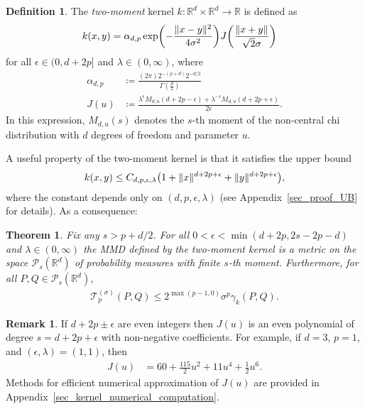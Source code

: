 \documentclass{article}
\newtheorem{theorem}{Theorem}
\theoremstyle{definition}
\newtheorem{definition}{Definition}
\newtheorem{remark}{Remark}
\newcommand{\reals}{\mathbb{R}}
\newcommand{\cP}{\mathcal{P}}
\newcommand{\cT}{\mathcal{T}}
\newcommand{\eps}{\epsilon}
\newcommand{\appname}{Appendix}
\newcommand{\appname}{Supplement}
\let\originalleft\left
\let\originalright\right
\renewcommand{\left}{\mathopen{}\mathclose\bgroup\originalleft}
\renewcommand{\right}{\aftergroup\egroup\originalright}
\begin{document}
\begin{definition}\label{def:two_moment} The \emph{two-moment} kernel $k \colon \reals^d \times \reals^d \to \reals$ is defined as
 \begin{align}
    k(x,y)  &= \alpha_{d,p} \exp\left( -\frac{ \|x-y\|^2}{ 4 \sigma^2}\right) J\left( \frac{ \|x+y\|}{\sqrt{2} \sigma} \right) \label{eq:kernel_two_moment}
\end{align}
for all $\eps \in (0,d+2p]$ and $\lambda \in (0,\infty)$, where 
\begin{align*}
\alpha_{d,p} &\coloneqq  \frac{(2 \pi) 2^{-(p+d)} 2^{-d/2} }{\Gamma(\frac{d}{2})}\\
    J(u)& \coloneqq  \frac{  \lambda^\eps M_{d,u}(d \!+\! 2p \!-\! \eps) +  \lambda^{-\eps} M_{d,u}(d\!+\!2p \!+\! \eps) }{ 2 \eps}.
\end{align*}
In this expression,  $M_{d,u}(s)$ denotes the $s$-th moment of the non-central chi distribution with  $d$ degrees of freedom and parameter $u$.
\end{definition}

A useful property of the two-moment kernel is that it satisfies the upper bound
\begin{align*}
k(x,y) \le C_{d,p,\eps,\lambda} \left(  1 + \|x\|^{d + 2p + \eps} + \|y\|^{d + 2p + \eps}\right),
\end{align*}
where the constant depends only on $(d,p,\eps, \lambda)$ (see \appname~\ref{sec_proof_UB} for details). As a consequence:

\begin{theorem}\label{thm_two_moment}
Fix any $s > p + d/2$. For all $0 < \eps < \min(d + 2p, 2s  - 2p - d) $ and $\lambda \in (0, \infty)$ the  MMD defined by the two-moment kernel is a metric on the space $\cP_s(\reals^d)$ of probability measures with finite $s$-th moment. Furthermore, for all $P, Q \in \cP_s(\reals^d)$, 
\begin{align*}
\cT_p^{(\sigma)}(P,Q)\le  2^{\max(p-1,0)} \sigma^p  \gamma_k(P, Q).
\end{align*}
\end{theorem}



\begin{remark}
If $d + 2p \pm \eps$ are even integers then $J(u)$ is an even polynomial of degree $s= d + 2p + \eps$ with non-negative coefficients. For example,  if $d = 3$, $p =1$, and  $(\eps, \lambda) = (1,1)$, then
\begin{align}
J(u)%
& = 60 + \frac{ 115}{2} u^2 + 11 u^4 + \frac{1}{2} u^6.
\end{align}
Methods for efficient numerical approximation of $J(u)$ are provided in \appname~\ref{sec_kernel_numerical_computation}.
\end{remark}
\end{document}
